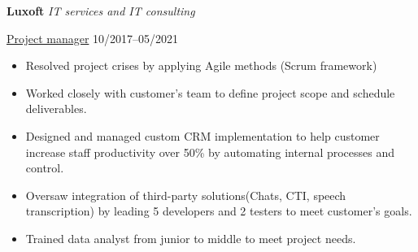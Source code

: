 \textbf{Luxoft} \textit{IT services and IT consulting} \par
\underline{Project manager} \hfill 10/2017--05/2021
\begin{itemize}
	\item Resolved project crises by applying Agile methods (Scrum framework)
 	\item Worked closely with customer's team to define project scope and schedule deliverables.  
   	\item Designed and managed  custom CRM implementation to help customer increase staff productivity over 50\% by automating internal processes and control.
   	\item Oversaw integration of third-party solutions(Chats, CTI, speech transcription) by leading  5 developers and 2 testers to meet customer's goals.
 	\item Trained data analyst from junior to middle to  meet  project needs.
\end{itemize}\par

